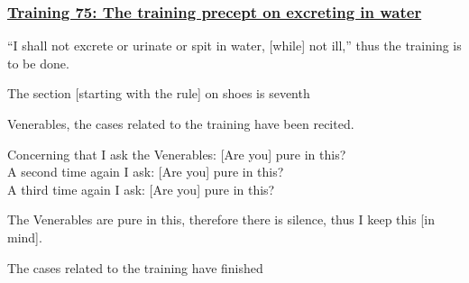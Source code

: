 \subsubsection*{\hyperref[sekh75]{Training 75: The training precept on excreting in water}}
\label{training75}

``I shall not excrete or urinate or spit in water, [while] not ill,'' thus the training is to be done.

\begin{center}
	The section [starting with the rule] on shoes is seventh
\end{center}



\medskip

\begin{center}
	Venerables, the cases related to the training have been recited.

	\smallskip

	Concerning that I ask the Venerables: [Are you] pure in this?\\
	A second time again I ask: [Are you] pure in this?\\
	A third time again I ask: [Are you] pure in this?

	\smallskip

	The Venerables are pure in this, therefore there is silence, thus I keep this [in mind].
\end{center}

\begin{outro}
	The cases related to the training have finished
\end{outro}

\clearpage

